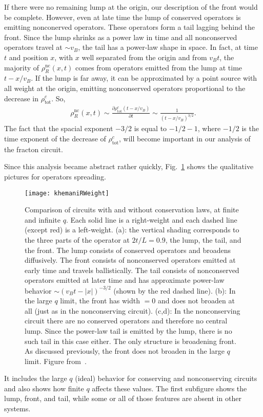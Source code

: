 \documentclass[a4paper,11pt]{article}
\newcommand{\pd}[2]{\frac{\partial #1}{\partial #2}}
\renewcommand{\th}[1]{\frac{1}{#1}}
\newcommand{\abs}[1]{\left| #1 \right|}
\newcommand{\nc}{\text{nc}}
\newcommand{\tot}{\text{tot}}
\begin{document}
If there were no remaining lump at the origin, our description of the front would be complete. However, even at late time the lump of conserved operators is emitting nonconerved operators. These operators form a tail lagging behind the front. Since the lump shrinks as a power law in time and all nonconserved operators travel at $\sim v_B$, the tail has a power-law shape in space. In fact, at time $t$ and position $x$, with $x$ well separated from the origin and from $v_Bt$, the majority of $\rho^\nc_R(x,t)$ comes from operators emitted from the lump at time $t-x/v_B$. If the lump is far away, it can be approximated by a point source with all weight at the origin, emitting nonconserved operators proportional to the decrease in $\rho^c_\tot$. So,
\begin{align}
\rho_R^\nc(x,t)\sim\pd{\rho_\tot^c(t-x/v_B)}{t} \sim\th{(t-x/v_B)^{3/2}}. 
	\label{eqn:powtail}
\end{align}
The fact that the spacial exponent $-3/2$ is equal to $-1/2-1$, where $-1/2$ is the time exponent of the decrease of $\rho_\tot^c$, will become important in our analysis of the fracton circuit.

Since this analysis became abstract rather quickly, Fig.~\ref{fig:khemaniRWeight} shows the qualitative pictures for operators spreading.
\begin{figure}
	\centering
	\texttt{[image: khemaniRWeight]}
	\caption{Comparison of circuits with and without conservation laws, at finite and infinite $q$. Each solid line is a right-weight and each dashed line (except red) is a left-weight. (a): the vertical shading corresponds to the three parts of the operator at $2t/L=0.9$, the lump, the tail, and the front. The lump consists of conserved operators and broadens diffusively. The front consists of nonconserved operators emitted at early time and travels ballistically. The tail consists of nonconserved operators emitted at later time and has approximate power-law behavior $\sim(v_Bt-\abs{x})^{-3/2}$ (shown by the red dashed line). (b): In the large $q$ limit, the front has width $=0$ and does not broaden at all (just as in the nonconserving circuit). (c,d): In the nonconserving circuit there are no conserved operators and therefore no central lump. Since the power-law tail is emitted by the lump, there is no such tail in this case either. The only structure is broadening front. As discussed previously, the front does not broaden in the large $q$ limit. Figure from~\cite{KhemaniOpSp}.}
	\label{fig:khemaniRWeight}
\end{figure}
It includes the large $q$ (ideal) behavior for conserving and nonconserving circuits and also shows how finite $q$ affects these values. The first subfigure shows the lump, front, and tail, while some or all of those features are absent in other systems.
\end{document}
